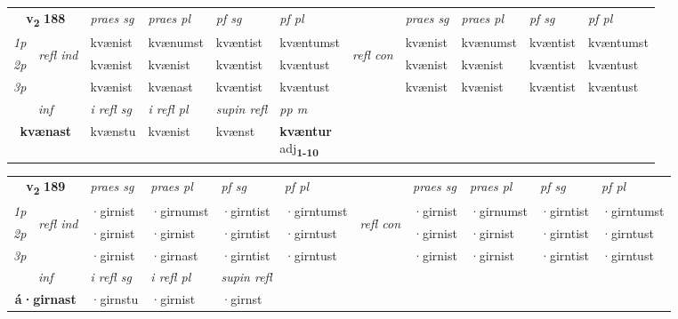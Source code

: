 \noindent
\begin{tabular}{lllllllllll} \toprule
\multicolumn{2}{c}{\textbf{v{\textsubscript{2}}} \Large{\textbf{188}}}  &  \textit{praes sg}  & \textit{praes pl}  &\textit{ pf sg} & \textit{pf pl} &  &  \textit{praes sg}  & \textit{praes pl}  & \textit{pf sg} & \textit{pf pl } \\*
	\cmidrule{3-6} \cmidrule{8-11}
 {\textit{1p}} & \multirow{3}{*}{\begin{turn}{90}\textit{refl ind}\end{turn}}  & kvænist & kvænumst & kvæntist & kvæntumst & \multirow{3}{*}{\begin{turn}{90}\textit{refl con}\end{turn}}  &kvænist & kvænumst & kvæntist & kvæntumst \\*
 {\textit{2p}} &  & kvænist & kvænist & kvæntist & kvæntust & &kvænist & kvænist & kvæntist & kvæntust \\*
 {\textit{3p}}  & & kvænist & kvænast & kvæntist & kvæntust & & kvænist & kvænist& kvæntist & kvæntust \\*
\cmidrule{3-6} \cmidrule{8-11}

   \multicolumn{2}{c}{\textit{inf}}   & \textit{i refl sg} & \textit{i refl pl}   & \textit{supin refl} & \textit{pp m} \\*
  \multicolumn{2}{c}{\textbf{kvænast}}    & kvænstu & kvænist   & kvænst & \specialcell{\textbf{kvæntur} \\ adj\textbf{\textsubscript{1-10}}} \\*
\end{tabular}

\noindent
\begin{tabular}{lllllllllll} \toprule
\multicolumn{2}{c}{\textbf{v{\textsubscript{2}}} \Large{\textbf{189}}}  &  \textit{praes sg}  & \textit{praes pl}  &\textit{ pf sg} & \textit{pf pl} &  &  \textit{praes sg}  & \textit{praes pl}  & \textit{pf sg} & \textit{pf pl } \\*
	\cmidrule{3-6} \cmidrule{8-11}
 {\textit{1p}} & \multirow{3}{*}{\begin{turn}{90}\textit{refl ind}\end{turn}}  & ·girnist & ·girnumst & ·girntist & ·girntumst & \multirow{3}{*}{\begin{turn}{90}\textit{refl con}\end{turn}}  &·girnist & ·girnumst & ·girntist & ·girntumst \\*
 {\textit{2p}} &  & ·girnist & ·girnist & ·girntist & ·girntust & &·girnist & ·girnist & ·girntist & ·girntust \\*
 {\textit{3p}}  & & ·girnist & ·girnast & ·girntist & ·girntust & & ·girnist & ·girnist& ·girntist & ·girntust \\*
\cmidrule{3-6} \cmidrule{8-11}

   \multicolumn{2}{c}{\textit{inf}}   & \textit{i refl sg} & \textit{i refl pl}   & \textit{supin refl}  \\*
  \multicolumn{2}{c}{\textbf{á\allowbreak ·girnast}}    & ·girnstu & ·girnist   & ·girnst  \\*
\end{tabular}

